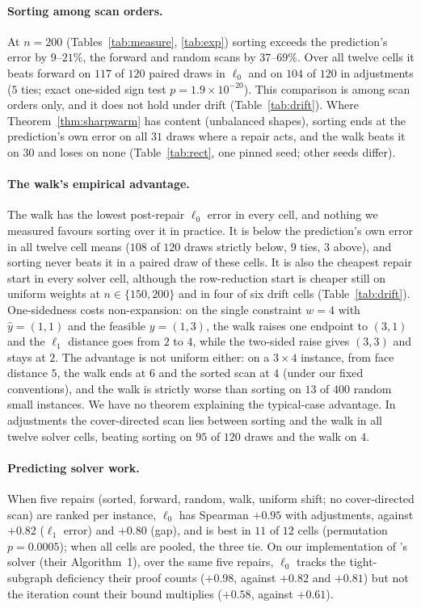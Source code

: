 \paragraph{Sorting among scan orders.} At $n = 200$ (Tables~\ref{tab:measure},
\ref{tab:exp}) sorting exceeds the prediction's error by $9$--$21\%$, the forward and random scans
by $37$--$69\%$. Over all twelve cells it beats forward on $117$ of $120$ paired draws in $\ell_0$
and on $104$ of $120$ in adjustments ($5$ ties; exact one-sided sign test
$p = 1.9\times10^{-20}$). This comparison is among scan orders only, and it does not hold under drift
(Table~\ref{tab:drift}). Where Theorem~\ref{thm:sharpwarm} has content (unbalanced shapes),
sorting ends at the prediction's own error on all $31$ draws where a repair acts, and the walk
beats it on $30$ and loses on none (Table~\ref{tab:rect}, one pinned seed; other seeds differ).

\paragraph{The walk's empirical advantage.} The walk has the lowest post-repair $\ell_0$ error in every
cell, and nothing we measured favours sorting over it in practice. It is below the prediction's own error in
all twelve cell means ($108$ of $120$ draws strictly below, $9$ ties, $3$ above), and sorting never
beats it in a paired draw of these cells. It is also the cheapest repair start in every solver
cell, although the row-reduction start is cheaper still on uniform weights at
$n \in \{150, 200\}$ and in four of six drift cells (Table~\ref{tab:drift}). One-sidedness costs
non-expansion: on the single
constraint $w=4$ with $\hat y=(1,1)$ and the feasible $y=(1,3)$, the walk raises one endpoint to
$(3,1)$ and the $\ell_1$ distance goes from $2$ to $4$, while the two-sided raise gives $(3,3)$
and stays at $2$. The advantage is not uniform either: on a $3\times4$ instance, from face distance $5$,
the walk ends at $6$ and the sorted scan at $4$ (under our fixed conventions), and the walk is
strictly worse than sorting on $13$ of $400$ random small instances. We have no theorem explaining
the typical-case advantage. In adjustments the cover-directed scan lies between sorting and the
walk in all twelve solver cells, beating sorting on $95$ of $120$ draws and the walk on $4$.

\paragraph{Predicting solver work.} When five repairs (sorted, forward, random,
walk, uniform shift; no cover-directed scan) are ranked per instance, $\ell_0$ has Spearman $+0.95$ with
adjustments, against $+0.82$ ($\ell_1$ error) and $+0.80$ (gap), and is best in $11$ of $12$ cells
(permutation $p = 0.0005$); when all cells are pooled, the three tie. On our implementation of
\citeauthor{chen2022}'s solver (their Algorithm~1), over the same five repairs, $\ell_0$ tracks the
tight-subgraph deficiency their proof counts ($+0.98$, against $+0.82$ and $+0.81$) but not the
iteration count their bound multiplies ($+0.58$, against $+0.61$).

